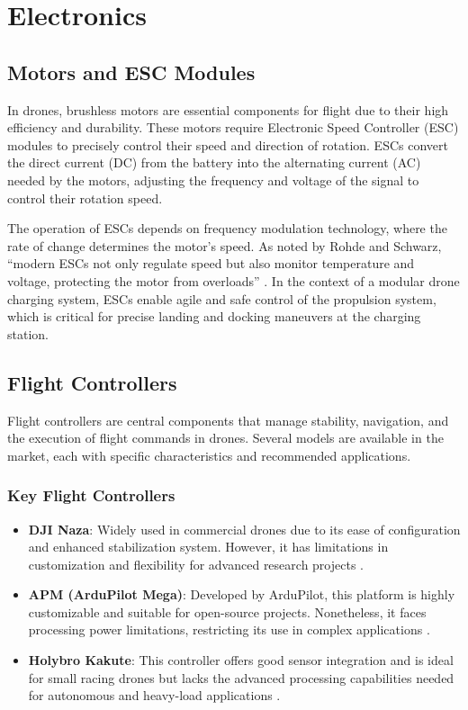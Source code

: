 \section{Electronics}

\subsection{Motors and ESC Modules}

In drones, brushless motors are essential components for flight due to their high efficiency and durability. These motors require Electronic Speed Controller (ESC) modules to precisely control their speed and direction of rotation. ESCs convert the direct current (DC) from the battery into the alternating current (AC) needed by the motors, adjusting the frequency and voltage of the signal to control their rotation speed.

The operation of ESCs depends on frequency modulation technology, where the rate of change determines the motor's speed. As noted by Rohde and Schwarz, “modern ESCs not only regulate speed but also monitor temperature and voltage, protecting the motor from overloads” \cite{rohdE_ESC}. In the context of a modular drone charging system, ESCs enable agile and safe control of the propulsion system, which is critical for precise landing and docking maneuvers at the charging station.

\subsection{Flight Controllers}

Flight controllers are central components that manage stability, navigation, and the execution of flight commands in drones. Several models are available in the market, each with specific characteristics and recommended applications.

\subsubsection{Key Flight Controllers}
\begin{itemize}
    \item \textbf{DJI Naza}: Widely used in commercial drones due to its ease of configuration and enhanced stabilization system. However, it has limitations in customization and flexibility for advanced research projects \cite{flight_controllers}.
    \item \textbf{APM (ArduPilot Mega)}: Developed by ArduPilot, this platform is highly customizable and suitable for open-source projects. Nonetheless, it faces processing power limitations, restricting its use in complex applications \cite{flight_controllers}.
    \item \textbf{Holybro Kakute}: This controller offers good sensor integration and is ideal for small racing drones but lacks the advanced processing capabilities needed for autonomous and heavy-load applications \cite{flight_controllers}.
\end{itemize}

